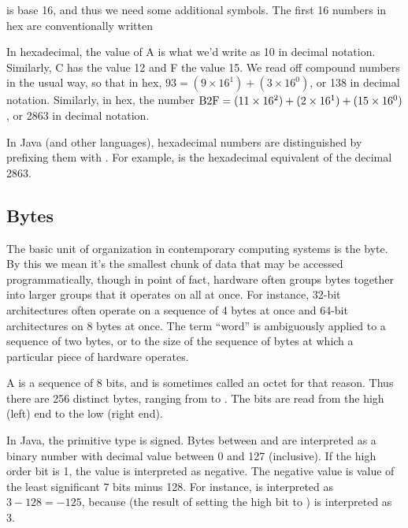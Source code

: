  is base 16, 
and thus we need some additional symbols.  The first 16 numbers in hex
are conventionally written


In hexadecimal, the value of A is what we'd write as 10 in decimal
notation.  Similarly, C has the value 12 and F the value 15.  We read
off compound numbers in the usual way, so that in hex, $93 = (9 \times
16^1) + (3 \times 16^0)$, or 138 in decimal notation.  Similarly, in
hex, the number $\mbox{\rm B2F} = (11 \times 16^2) + (2 \times 16^1) + (15 \times
16^0)$, or 2863 in decimal notation.

In Java (and other languages), hexadecimal
numbers are distinguished by prefixing
them with .  For example,
 is the hexadecimal equivalent of the decimal 2863.

\subsection{Bytes}\label{section:java-bytes} 

The basic unit of organization in contemporary computing systems is
the byte.  By this we mean it's the smallest chunk of data that may be
accessed programmatically, though in point of fact, hardware often
groups bytes together into larger groups that it operates on all at
once.  For instance, 32-bit architectures often operate on a sequence
of 4 bytes at once and 64-bit architectures on 8 bytes at once.  The
term ``word'' is ambiguously applied to a sequence of two bytes, or to
the size of the sequence of bytes at which a particular piece of
hardware operates.

A  is a sequence of 8 bits, and is sometimes
called an octet for that reason.  Thus there are 256 distinct bytes,
ranging from  to .  The bits are read
from the high (left) end to the low (right end).

In Java, the  primitive type is
signed.  Bytes between  and  are
interpreted as a binary number with decimal value between 0 and 127
(inclusive).  If the high order bit is 1, the value is interpreted as
negative.  The negative value is value of the least significant 7 bits
minus 128.  For instance,
 is interpreted as $3 - 128 = -125$, because
 (the result of setting the high bit to ) is interpreted as 3.

